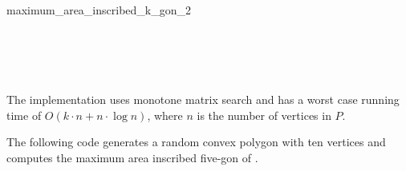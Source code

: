 \begin{ccRefFunction}{maximum_area_inscribed_k_gon_2}
  \ccSeeAlso
  \\
  \\
  \\
  \\
  \\
  
  \ccImplementation The implementation uses monotone matrix search
  \cite{akmsw-gamsa-87} and has a worst case running time of $O(k
  \cdot n + n \cdot \log n)$, where $n$ is the number of vertices in
  $P$.

  \ccExample The following code generates a random convex polygon
   with ten vertices and computes the maximum area inscribed
  five-gon of .


\end{ccRefFunction}
    
